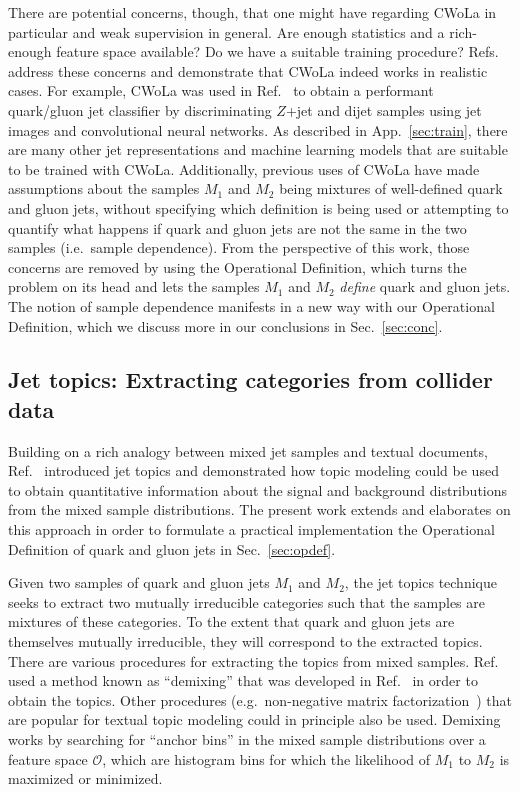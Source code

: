 \documentclass[letterpaper,11pt]{article}
\DeclareRobustCommand{\Sec}[1]{Sec.~\ref{#1}}
\DeclareRobustCommand{\App}[1]{App.~\ref{#1}}
\DeclareRobustCommand{\Ref}[1]{Ref.~\cite{#1}}
\DeclareRobustCommand{\Refs}[1]{Refs.~\cite{#1}}
\renewcommand{\O}{\mathcal{O}}
\begin{document}
There are potential concerns, though, that one might have regarding CWoLa in particular and weak supervision in general.
%
Are enough statistics and a rich-enough feature space available?
%
Do we have a suitable training procedure?
%
\Refs{Metodiev:2017vrx, Cohen:2017exh, Komiske:2018oaa} address these concerns and demonstrate that CWoLa indeed works in realistic cases.
%
For example, CWoLa was used in \Ref{Komiske:2018oaa} to obtain a performant quark/gluon jet classifier by discriminating $Z$+jet and dijet samples using jet images and convolutional neural networks.
%
As described in \App{sec:train}, there are many other jet representations and machine learning models that are suitable to be trained with CWoLa.
%
Additionally, previous uses of CWoLa have made assumptions about the samples $M_1$ and $M_2$ being mixtures of well-defined quark and gluon jets, without specifying which definition is being used or attempting to quantify what happens if quark and gluon jets are not the same in the two samples (i.e.\ sample dependence).
%
From the perspective of this work, those concerns are removed by using the Operational Definition, which turns the problem on its head and lets the samples $M_1$ and $M_2$ \emph{define} quark and gluon jets.
%
The notion of sample dependence manifests in a new way with our Operational Definition, which we discuss more in our conclusions in \Sec{sec:conc}.



\subsection{Jet topics: Extracting categories from collider data}
\label{sec:topics}

Building on a rich analogy between mixed jet samples and textual documents, \Ref{Metodiev:2018ftz} introduced jet topics and demonstrated how topic modeling could be used to obtain quantitative information about the signal and background distributions from the mixed sample distributions.
%
The present work extends and elaborates on this approach in order to formulate a practical implementation the Operational Definition of quark and gluon jets in \Sec{sec:opdef}.


Given two samples of quark and gluon jets $M_1$ and $M_2$, the jet topics technique seeks to extract two mutually irreducible categories such that the samples are mixtures of these categories.
%
To the extent that quark and gluon jets are themselves mutually irreducible, they will correspond to the extracted topics.
%
There are various procedures for extracting the topics from mixed samples.
%
\Ref{Metodiev:2018ftz} used a method known as ``demixing'' that was developed in \Ref{katz2017decontamination} in order to obtain the topics.
%
Other procedures (e.g.\ non-negative matrix factorization~\cite{Arora:2012:LTM:2417500.2417847}) that are popular for textual topic modeling could in principle also be used.
%
Demixing works by searching for ``anchor bins'' in the mixed sample distributions over a feature space $\O$, which are histogram bins for which the likelihood of $M_1$ to $M_2$ is maximized or minimized.
\end{document}
